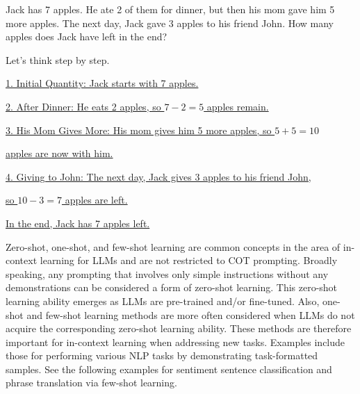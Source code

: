 \vspace{0.5em}
\begin{tcolorbox}
\begin{center}
\parbox{0.9\textwidth}
{

{\color{blue} Jack has 7 apples. He ate 2 of them for dinner, but then his mom gave him 5 more apples. The next day, Jack gave 3 apples to his friend John. How many apples does Jack have left in the end?}

{\color{blue} Let's think step by step.}

\vspace{0.3em}

\underline{1. Initial Quantity: Jack starts with 7 apples.}

\underline{2. After Dinner: He eats 2 apples, so $7-2=5$ apples remain.}

\underline{3. His Mom Gives More: His mom gives him 5 more apples, so $5+5=10$ }

\hspace{0.8em} \underline{apples are now with him.}

\underline{4. Giving to John: The next day, Jack gives 3 apples to his friend John,}

\hspace{0.8em} \underline{so $10-3=7$ apples are left.}

\underline{In the end, Jack has 7 apples left.}

}
\end{center}
\end{tcolorbox}
\vspace{0.5em}

Zero-shot, one-shot, and few-shot learning are common concepts in the area of in-context learning for LLMs and are not restricted to COT prompting. Broadly speaking, any prompting that involves only simple instructions without any demonstrations can be considered a form of zero-shot learning. This zero-shot learning ability emerges as LLMs are pre-trained and/or fine-tuned. Also, one-shot and few-shot learning methods are more often considered when LLMs do not acquire the corresponding zero-shot learning ability. These methods are therefore important for in-context learning when addressing new tasks. Examples include those for performing various NLP tasks by demonstrating task-formatted samples. See the following examples for sentiment sentence classification and phrase translation via few-shot learning.

